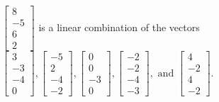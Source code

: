 \begin{exercise}
\begin{exerciseStatement}
  \end{exerciseStatement}
  \begin{exerciseAnswer}
   \(\left[\begin{array}{c}
8 \\
-5 \\
6 \\
2
\end{array}\right]\) 
  	 is  
	a linear combination of the vectors \(\left[\begin{array}{c}
3 \\
-3 \\
-4 \\
0
\end{array}\right] , \left[\begin{array}{c}
-5 \\
2 \\
-4 \\
-2
\end{array}\right] , \left[\begin{array}{c}
0 \\
0 \\
-3 \\
0
\end{array}\right] , \left[\begin{array}{c}
-2 \\
-2 \\
-4 \\
-3
\end{array}\right] , \text{ and } \left[\begin{array}{c}
4 \\
-2 \\
4 \\
-2
\end{array}\right]\).

	
  


  \end{exerciseAnswer}
\end{exercise}